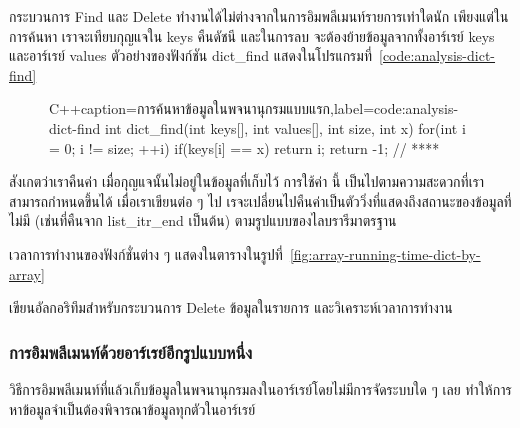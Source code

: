 กระบวนการ Find และ Delete ทำงาน{\wbr}ได้{\wbr}ไม่{\wbr}ต่าง{\wbr}จาก{\wbr}ใน{\wbr}การ{\wbr}อิม{\wbr}พลี{\wbr}เมนท์{\wbr}รายการ{\wbr}เท่าใด{\wbr}นัก{\wbr}
เพียงแต่{\wbr}ใน{\wbr}การ{\wbr}ค้นหา เรา{\wbr}จะ{\wbr}เทียบ{\wbr}กุญแจ{\wbr}ใน {\ct keys} คืน{\wbr}ดัชนี และ{\wbr}ใน{\wbr}การ{\wbr}ลบ{\wbr}
จะ{\wbr}ต้อง{\wbr}ย้าย{\wbr}ข้อมูล{\wbr}จาก{\wbr}ทั้ง{\wbr}อาร์เรย์ {\ct keys} และ{\wbr}อาร์เรย์ {\ct values}
ตัวอย่าง{\wbr}ของ{\wbr}ฟังก์ชัน {\ct dict\_find }
แสดง{\wbr}ใน{\wbr}โปรแกรม{\wbr}ที่~\ref{code:analysis-dict-find}

\begin{figure}
\latintext
\begin{codelist}{C++}{caption={\thaitext การ{\wbr}ค้นหา{\wbr}ข้อมูล{\wbr}ใน{\wbr}พจนานุกรม{\wbr}แบบ{\wbr}แรก\latintext},label=code:analysis-dict-find}
int dict_find(int keys[], int values[], int size, int x)
{
  for(int i = 0; i != size; ++i)
    if(keys[i] == x)
      return i;
  return -1;                // ****
}
\end{codelist}
\thaitext
\end{figure}

สังเกต{\wbr}ว่า{\wbr}เรา{\wbr}คืน{\wbr}ค่า {} เมื่อ{\wbr}กุญแจ{\wbr}นั้น{\wbr}ไม่{\wbr}อยู่{\wbr}ใน{\wbr}ข้อมูล{\wbr}ที่{\wbr}เก็บ{\wbr}ไว้ การ{\wbr}ใช้{\wbr}ค่า {} นี้{\wbr}
เป็น{\wbr}ไป{\wbr}ตาม{\wbr}ความ{\wbr}สะดวก{\wbr}ที่{\wbr}เรา{\wbr}สามารถ{\wbr}กำหนด{\wbr}ขึ้น{\wbr}ได้ เมื่อ{\wbr}เรา{\wbr}เขียน{\wbr}ต่อ ๆ ไป{\wbr}
เรจะ{\wbr}เปลี่ยน{\wbr}ไป{\wbr}คืน{\wbr}ค่า{\wbr}เป็น{\wbr}ตัว{\wbr}วิ่ง{\wbr}ที่{\wbr}แสดง{\wbr}ถึง{\wbr}สถานะ{\wbr}ของ{\wbr}ข้อมูล{\wbr}ที่{\wbr}ไม่{\wbr}มี (เช่น{\wbr}ที่{\wbr}คืน{\wbr}จาก {\ct
  list\_itr\_end} เป็นต้น) ตาม{\wbr}รูปแบบ{\wbr}ของ{\wbr}ไลบ{\wbr}รา{\wbr}รี{\wbr}มาตรฐาน{\wbr}

เวลา{\wbr}การ{\wbr}ทำงาน{\wbr}ของ{\wbr}ฟังก์ชั่น{\wbr}ต่าง ๆ
แสดง{\wbr}ใน{\wbr}ตาราง{\wbr}ใน{\wbr}รูป{\wbr}ที่~\ref{fig:array-running-time-dict-by-array}

\begin{quiz}{}
เขียน{\wbr}อัล{\wbr}กอ{\wbr}ริ{\wbr}ทึม{\wbr}สำหรับ{\wbr}กระบวนการ Delete ข้อมูล{\wbr}ใน{\wbr}รายการ และ{\wbr}วิเคราะห์{\wbr}เวลา{\wbr}การ{\wbr}ทำงาน{\wbr}
\end{quiz}

\subsubsection{การ{\wbr}อิม{\wbr}พลี{\wbr}เมนท์{\wbr}ด้วย{\wbr}อาร์เรย์{\wbr}อีก{\wbr}รูปแบบ{\wbr}หนึ่ง}
วิธีการ{\wbr}อิม{\wbr}พลี{\wbr}เมนท์{\wbr}ที่แล้ว{\wbr}เก็บ{\wbr}ข้อมูล{\wbr}ใน{\wbr}พจนานุกรม{\wbr}ลง{\wbr}ใน{\wbr}อาร์เรย์{\wbr}โดย{\wbr}ไม่{\wbr}มี{\wbr}การ{\wbr}จัด{\wbr}ระบบ{\wbr}ใด ๆ เลย{\wbr}
ทำ{\wbr}ให้การ{\wbr}หา{\wbr}ข้อมูล{\wbr}จำเป็น{\wbr}ต้อง{\wbr}พิจารณา{\wbr}ข้อมูล{\wbr}ทุก{\wbr}ตัว{\wbr}ใน{\wbr}อาร์เรย์

